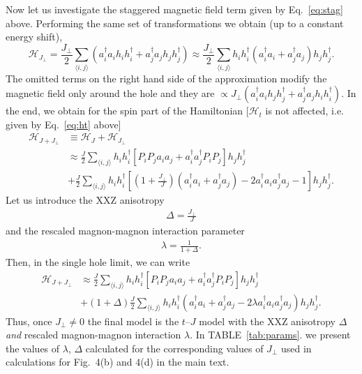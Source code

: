 \documentclass[%
 reprint,
 amsmath,amssymb,
 aps, onecolumn,
prl,
]{revtex4-1}
\newcommand{\mean}[1]{\langle#1\rangle}
\begin{document}
Now let us investigate the staggered magnetic field term given by Eq.~\eqref{eq:stag} above.
%
Performing the same set of transformations we obtain (up to a constant energy shift),
%
\begin{equation}
	\mathcal{H}_{J_\perp} = \frac{J_\perp}{2} \sum_{\mean{i,j}} 
	\left(a_i^\dag a_i h_i h_i^\dag + a_j^\dag a_j h_j h_j^\dag \right) \approx \frac{J_\perp}{2} \sum_{\mean{i,j}} 
	h_i h_i^\dag \left(a_i^\dag a_i + a_j^\dag a_j \right) h_j h_j^\dag.
\end{equation}
%
The omitted terms on the right hand side of the approximation modify the magnetic field only around the hole and they are $\propto J_\perp \left( a_i^\dag a_i h_j h_j^\dag + a_j^\dag a_j h_i h_i^\dag \right)$. In the end, we obtain for the spin part of the Hamiltonian [$\mathcal{H}_t$ is not affected, i.e. given by Eq.~\eqref{eq:ht} above]
%
{\color{red}
\begin{equation}
	\begin{aligned}
	\mathcal{H}_{J+J_\perp} &\equiv \mathcal{H}_{J} + \mathcal{H}_{J_\perp} \\
	&\approx \frac{J}{2}\sum_{\mean{i,j}} h_i h_i^\dag \left[P_i P_j a_i a_j + a_i^\dag a_j^\dag P_i P_j \right] h_j h_j^\dag \\
	&+ \frac{J}{2} \sum_{\mean{i,j}} h_i h_i^\dag \left[\left(1+\frac{J_\perp}{J}\right)\left(a_i^\dag a_i + a_j^\dag a_j\right) - 2 a_i^\dag a_i a_j^\dag a_j - 1\right] h_j h_j^\dag.
	\end{aligned}
\end{equation}
}
%
Let us introduce the XXZ anisotropy 
\begin{align}
\Delta = \frac{J_\perp}{J} 
\end{align}
and the  rescaled magnon-magnon interaction parameter 
\begin{align}
\lambda = \frac{1} {1+\Delta}.
\end{align}
Then, in the single hole limit, we can write
%
{\color{red}
\begin{equation}
	\begin{aligned}
	\mathcal{H}_{J+J_\perp} 
	&\approx \frac{J}{2}\sum_{\mean{i,j}} h_i h_i^\dag \left[P_i P_j a_i a_j + a_i^\dag a_j^\dag P_i P_j \right] h_j h_j^\dag  \\
	&+ (1+\Delta) \frac{J}{2} \sum_{\mean{i,j}} h_i h_i^\dag \left(a_i^\dag a_i + a_j^\dag a_j - 2\lambda a_i^\dag a_i a_j^\dag a_j \right) h_j h_j^\dag.
	\end{aligned}
\end{equation}
}
%
Thus, once  $J_\perp \neq 0$ the final model is the $t$--$J$ model with the XXZ anisotropy $\Delta$ 
{\it and} rescaled magnon-magnon interaction $\lambda$. In TABLE~\ref{tab:params}. 
we present the values of $\lambda$, $\Delta$ calculated for the corresponding values of $J_\perp$ 
used in calculations for Fig.~4(b) and 4(d) in the main text.
\end{document}
